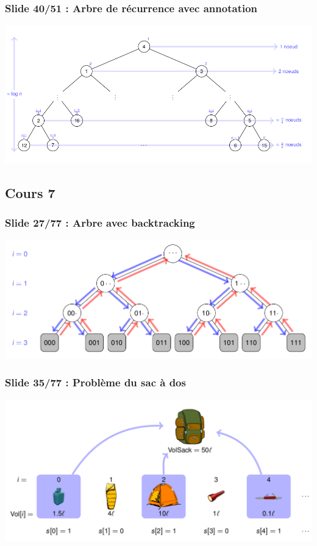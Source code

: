 \documentclass[12pt, a4paper]{article}
\begin{document}
\subsubsection{Slide 40/51 : Arbre de récurrence avec annotation}
\begin{center}
\includegraphics[scale=0.3]{images/INFO-H304_C6_2}
\end{center}
\subsection{Cours 7}
\subsubsection{Slide 27/77 : Arbre avec backtracking}
\begin{center}
\includegraphics[scale=0.3]{images/INFO-H304_C7_1}
\end{center}
\subsubsection{Slide 35/77 : Problème du sac à dos}
\begin{center}
\includegraphics[scale=0.3]{images/INFO-H304_C7_2}
\end{center}
\end{document}
